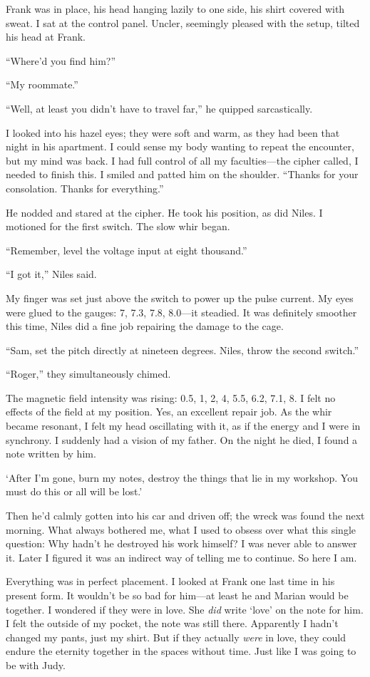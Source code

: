 \documentclass[
]{article}
\begin{document}
Frank was in place, his head hanging lazily to one side, his shirt
covered with sweat. I sat at the control panel. Uncler, seemingly
pleased with the setup, tilted his head at Frank.

``Where'd you find him?''

``My roommate.''

``Well, at least you didn't have to travel far,'' he quipped
sarcastically.

I looked into his hazel eyes; they were soft and warm, as they had been
that night in his apartment. I could sense my body wanting to repeat the
encounter, but my mind was back. I had full control of all my
faculties---the cipher called, I needed to finish this. I smiled and
patted him on the shoulder. ``Thanks for your consolation. Thanks for
everything.''

He nodded and stared at the cipher. He took his position, as did Niles.
I motioned for the first switch. The slow whir began.

``Remember, level the voltage input at eight thousand.''

``I got it,'' Niles said.

My finger was set just above the switch to power up the pulse current.
My eyes were glued to the gauges: 7, 7.3, 7.8, 8.0---it steadied. It was
definitely smoother this time, Niles did a fine job repairing the damage
to the cage.

``Sam, set the pitch directly at nineteen degrees. Niles, throw the
second switch.''

``Roger,'' they simultaneously chimed.

The magnetic field intensity was rising: 0.5, 1, 2, 4, 5.5, 6.2, 7.1, 8.
I felt no effects of the field at my position. Yes, an excellent repair
job. As the whir became resonant, I felt my head oscillating with it, as
if the energy and I were in synchrony. I suddenly had a vision of my
father. On the night he died, I found a note written by him.

`After I'm gone, burn my notes, destroy the things that lie in my
workshop. You must do this or all will be lost.'

Then he'd calmly gotten into his car and driven off; the wreck was found
the next morning. What always bothered me, what I used to obsess over
what this single question: Why hadn't he destroyed his work himself? I
was never able to answer it. Later I figured it was an indirect way of
telling me to continue. So here I am.

Everything was in perfect placement. I looked at Frank one last time in
his present form. It wouldn't be so bad for him---at least he and Marian
would be together. I wondered if they were in love. She \emph{did} write
`love' on the note for him. I felt the outside of my pocket, the note
was still there. Apparently I hadn't changed my pants, just my shirt.
But if they actually \emph{were} in love, they could endure the eternity
together in the spaces without time. Just like I was going to be with
Judy.
\end{document}
